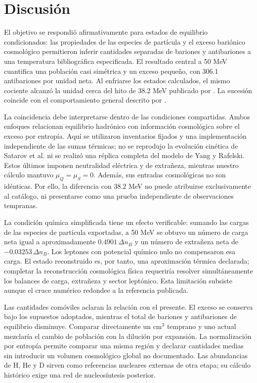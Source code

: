 \section{Discusión}
El objetivo se respondió afirmativamente para estados de equilibrio condicionados: las propiedades de las especies de partícula y el exceso bariónico cosmológico permitieron inferir cantidades separadas de bariones y antibariones a una temperatura bibliográfica especificada. El resultado central a 50 MeV cuantifica una población casi simétrica y un exceso pequeño, con 306.1 antibariones por unidad neta. Al enfriarse los estados calculados, el mismo cociente alcanzó la unidad cerca del hito de 38.2 MeV publicado por \citet{Yang2022}. La sucesión coincide con el comportamiento general descrito por \citet{Satarov2013}.

La coincidencia debe interpretarse dentro de las condiciones compartidas. Ambos enfoques relacionan equilibrio hadrónico con información cosmológica sobre el exceso por entropía. Aquí se utilizaron inventarios fijados y una implementación independiente de las sumas térmicas; no se reprodujo la evolución cinética de Satarov et al. ni se realizó una réplica completa del modelo de Yang y Rafelski. Estos últimos imponen neutralidad eléctrica y de extrañeza, mientras nuestro cálculo mantuvo $\mu_Q=\mu_S=0$. Además, sus entradas cosmológicas no son idénticas. Por ello, la diferencia con 38.2 MeV no puede atribuirse exclusivamente al catálogo, ni presentarse como una prueba independiente de observaciones tempranas.

La condición química simplificada tiene un efecto verificable: sumando las cargas de las especies de partícula exportadas, a 50 MeV se obtuvo un número de carga neta igual a aproximadamente $0.4901\,\Delta n_B$ y un número de extrañeza neta de $-0.03253\,\Delta n_B$. Los leptones con potencial químico nulo no compensaron esa carga. El estado reconstruido es, por tanto, una aproximación térmica declarada; completar la reconstrucción cosmológica física requeriría resolver simultáneamente los balances de carga, extrañeza y sector leptónico. Esta limitación subsiste aunque el cruce numérico redondee a la referencia publicada.

Las cantidades comóviles aclaran la relación con el presente. El exceso se conserva bajo los supuestos adoptados, mientras el total de bariones y antibariones de equilibrio disminuye. Comparar directamente un cm$^3$ temprano y uno actual mezclaría el cambio de población con la dilución por expansión. La normalización por entropía permite comparar una misma región y declarar cantidades medias sin introducir un volumen cosmológico global no documentado. Las abundancias de H, He y D sirven como referencias nucleares externas de otra etapa; su cálculo histórico exige una red de nucleosíntesis posterior.

